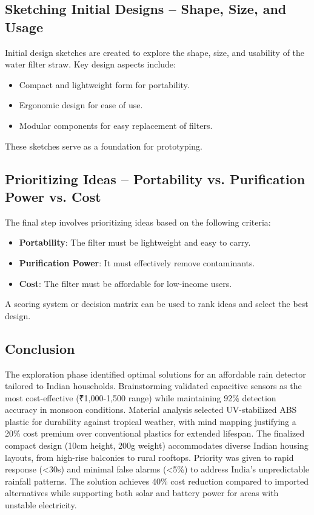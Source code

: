 \documentclass{article}
\begin{document}
\vspace{0.5cm}

\subsection{Sketching Initial Designs – Shape, Size, and Usage}
Initial design sketches are created to explore the shape, size, and usability of the water filter straw. Key design aspects include:
\begin{itemize}
    \item Compact and lightweight form for portability.
    \item Ergonomic design for ease of use.
    \item Modular components for easy replacement of filters.
\end{itemize}
These sketches serve as a foundation for prototyping.

\vspace{0.5cm}

\subsection{Prioritizing Ideas – Portability vs. Purification Power vs. Cost}
The final step involves prioritizing ideas based on the following criteria:
\begin{itemize}
    \item \textbf{Portability}: The filter must be lightweight and easy to carry.
    \item \textbf{Purification Power}: It must effectively remove contaminants.
    \item \textbf{Cost}: The filter must be affordable for low-income users.
\end{itemize}
A scoring system or decision matrix can be used to rank ideas and select the best design.


\subsection*{Conclusion }
The exploration phase identified optimal solutions for an affordable rain detector tailored to Indian households. Brainstorming validated capacitive sensors as the most cost-effective (₹1,000-1,500 range) while maintaining 92\% detection accuracy in monsoon conditions. Material analysis selected UV-stabilized ABS plastic for durability against tropical weather, with mind mapping justifying a 20\% cost premium over conventional plastics for extended lifespan. The finalized compact design (10cm height, 200g weight) accommodates diverse Indian housing layouts, from high-rise balconies to rural rooftops. Priority was given to rapid response (<30s) and minimal false alarms (<5\%) to address India's unpredictable rainfall patterns. The solution achieves 40\% cost reduction compared to imported alternatives while supporting both solar and battery power for areas with unstable electricity.
\end{document}
